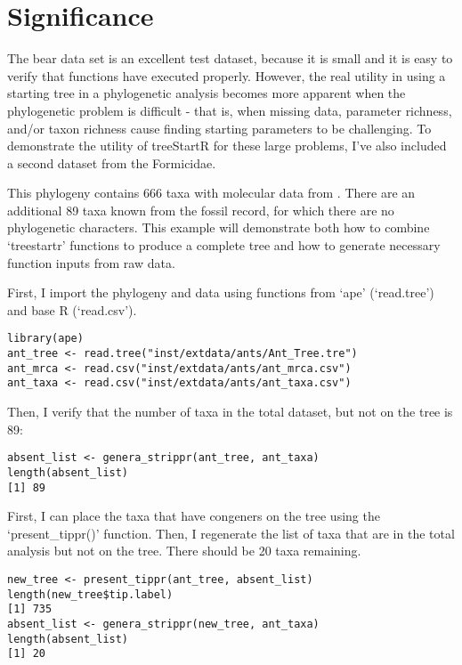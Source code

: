 \documentclass[11pt]{article}
\begin{document}
\section{Significance}

The bear data set is an excellent test dataset, because it is small and it is easy to verify that functions have executed properly.
However, the real utility in using a starting tree in a phylogenetic analysis becomes more apparent when the phylogenetic problem is difficult - that is, when missing data, parameter richness, and/or taxon richness cause finding starting parameters to be challenging.
To demonstrate the utility of treeStartR for these large problems, I've also included a second dataset from the Formicidae. \par

This phylogeny contains 666 taxa with molecular data from \cite{blanchard}. 
There are an additional 89 taxa known from the fossil record, for which there are no phylogenetic characters.
This example will demonstrate both how to combine `treestartr' functions to produce a complete tree and how to generate necessary function inputs from raw data. \par
First, I import the phylogeny and data using functions from `ape' (`read.tree') and base R (`read.csv').

{\tt \begin{snugshade*}
\begin{lstlisting}
library(ape)
ant_tree <- read.tree("inst/extdata/ants/Ant_Tree.tre")
ant_mrca <- read.csv("inst/extdata/ants/ant_mrca.csv")
ant_taxa <- read.csv("inst/extdata/ants/ant_taxa.csv")
\end{lstlisting}
\end{snugshade*}}

Then, I verify that the number of taxa in the total dataset, but not on the tree is 89:
{\tt \begin{snugshade*}
\begin{lstlisting}
absent_list <- genera_strippr(ant_tree, ant_taxa)
length(absent_list)
[1] 89
\end{lstlisting}
\end{snugshade*}}

First, I can place the taxa that have congeners on the tree using the `present\_tippr()' function. 
Then, I regenerate the list of taxa that are in the total analysis but not on the tree. There should be 20 taxa remaining.

{\tt \begin{snugshade*}
\begin{lstlisting}
new_tree <- present_tippr(ant_tree, absent_list)
length(new_tree$tip.label)
[1] 735
absent_list <- genera_strippr(new_tree, ant_taxa)
length(absent_list)
[1] 20
\end{lstlisting}
\end{snugshade*}}
\end{document}
